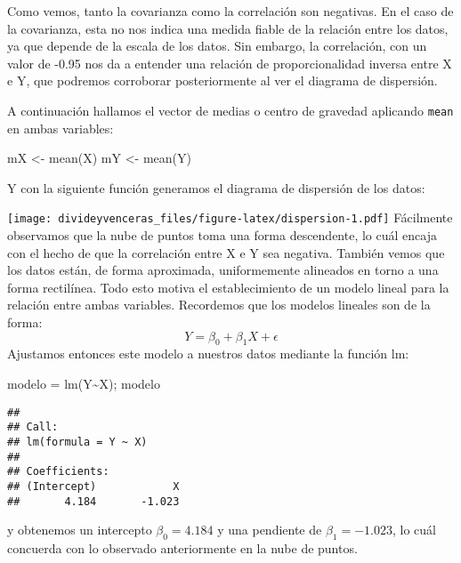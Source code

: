 \documentclass[
]{article}
\newenvironment{Shaded}{\begin{snugshade}}{\end{snugshade}}
\newcommand{\FunctionTok}[1]{\textcolor[rgb]{0.00,0.00,0.00}{#1}}
\newcommand{\NormalTok}[1]{#1}
\newcommand{\OtherTok}[1]{\textcolor[rgb]{0.56,0.35,0.01}{#1}}
\newcommand{\SpecialCharTok}[1]{\textcolor[rgb]{0.00,0.00,0.00}{#1}}
\begin{document}
Como vemos, tanto la covarianza como la correlación son negativas. En el
caso de la covarianza, esta no nos indica una medida fiable de la
relación entre los datos, ya que depende de la escala de los datos. Sin
embargo, la correlación, con un valor de -0.95 nos da a entender una
relación de proporcionalidad inversa entre X e Y, que podremos
corroborar posteriormente al ver el diagrama de dispersión.

A continuación hallamos el vector de medias o centro de gravedad
aplicando \texttt{mean} en ambas variables:

\begin{Shaded}
\begin{Highlighting}[]
\NormalTok{mX }\OtherTok{\textless{}{-}} \FunctionTok{mean}\NormalTok{(X)}
\NormalTok{mY }\OtherTok{\textless{}{-}} \FunctionTok{mean}\NormalTok{(Y)}
\end{Highlighting}
\end{Shaded}

Y con la siguiente función generamos el diagrama de dispersión de los
datos:

\texttt{[image: divideyvenceras\_files/figure-latex/dispersion-1.pdf]}
Fácilmente observamos que la nube de puntos toma una forma descendente,
lo cuál encaja con el hecho de que la correlación entre X e Y sea
negativa. También vemos que los datos están, de forma aproximada,
uniformemente alineados en torno a una forma rectilínea. Todo esto
motiva el establecimiento de un modelo lineal para la relación entre
ambas variables. Recordemos que los modelos lineales son de la forma: \[
Y = \beta_0 + \beta_1X + \epsilon
\] Ajustamos entonces este modelo a nuestros datos mediante la función
lm:

\begin{Shaded}
\begin{Highlighting}[]
\NormalTok{modelo }\OtherTok{=} \FunctionTok{lm}\NormalTok{(Y}\SpecialCharTok{\textasciitilde{}}\NormalTok{X); modelo}
\end{Highlighting}
\end{Shaded}

\begin{verbatim}
## 
## Call:
## lm(formula = Y ~ X)
## 
## Coefficients:
## (Intercept)            X  
##       4.184       -1.023
\end{verbatim}

y obtenemos un intercepto \(\beta_0 = 4.184\) y una pendiente de
\(\beta_1 = -1.023\), lo cuál concuerda con lo observado anteriormente
en la nube de puntos.
\end{document}
